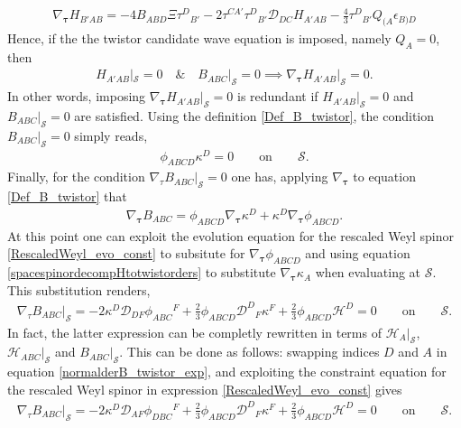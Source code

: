 \documentclass[10pt,a4paper]{article}
\theoremstyle{plain}
\begin{document}
\begin{align}
\nabla_{\bm\tau} H_{B'AB} = -4 B_{ABD} \Xi \tau ^{D}{}_{B'} -2 \tau ^{CA'}
\tau ^{D}{}_{B'} \mathcal{D} _{DC}H_{A'AB} - \tfrac{4}{3} \tau
^{D}{}_{B'}Q_{(A}\epsilon _{B)D}
\end{align}
Hence, if the the twistor candidate wave equation is imposed, namely
$Q_A=0$, then
\begin{align}
H_{A'AB}|_{\mathcal{S}}=0\quad \& \quad B_{ABC}|_{\mathcal{S}}=0
\implies \nabla_{\bm\tau} H_{A'AB}|_{\mathcal{S}}=0.
\end{align}
In other words, imposing $\nabla_{\bm\tau} H_{A'AB}|_{\mathcal{S}}=0$ is
redundant if $H_{A'AB}|_{\mathcal{S}}=0$ and $
B_{ABC}|_{\mathcal{S}}=0$ are satisfied.  Using the definition
\eqref{Def_B_twistor}, the condition $B_{ABC}|_{\mathcal{S}}=0$ simply
reads,
\begin{align}
  \phi_{ABCD}\kappa^D=0 \qquad \text{on} \qquad \mathcal{S}.
\end{align}
Finally, for the condition $\nabla_{\tau}B_{ABC}|_{\mathcal{S}}=0$ one
has, applying $\nabla_{\bm\tau}$ to equation \eqref{Def_B_twistor} that
\begin{align}
\nabla_{\bm\tau} B_{ABC} = \phi _{ABCD}\nabla_{\bm\tau} \kappa ^{D} + \kappa
^{D} \nabla_{\bm\tau} \phi _{ABCD} .
\end{align}
At this point one can exploit the evolution equation for the rescaled
Weyl spinor \eqref{RescaledWeyl_evo_const} to subsitute for
$\nabla_{\bm\tau} \phi_{ABCD}$ and using equation
\eqref {spacespinordecompHtotwistorders}
to substitute $\nabla_{\bm\tau} \kappa_A$ when evaluating at
$\mathcal{S}$. This substitution renders,
\begin{align}\label{normalderB_twistor_exp}
\nabla_{\tau}B_{ABC}|_{\mathcal{S}}= -2\kappa ^{D} \mathcal{D}
_{DF}\phi _{ABC}{}^{F} + \tfrac{2}{3} \phi _{ABCD} \mathcal{D}
^{D}{}_{F}\kappa ^{F} + \tfrac{2}{3}\phi_{ABCD}\mathcal{H}^D = 0 \qquad \text{on} \qquad \mathcal{S}.
\end{align}
In fact, the latter expression can be completly rewritten in terms of
$\mathcal{H}_A|_{\mathcal{S}}$, $\mathcal{H}_{ABC}|_{\mathcal{S}}$
and $B_{ABC}|_{\mathcal{S}}$. This can be done as follows: swapping indices $D$ and $A$ in equation
\eqref{normalderB_twistor_exp}, and exploiting the constraint equation for the rescaled Weyl spinor in expression
\eqref{RescaledWeyl_evo_const} gives
\begin{align}\label{normalderB_twistor_exp2}
\nabla_{\tau}B_{ABC}|_{\mathcal{S}}= -2 \kappa ^{D} \mathcal{D} _{AF}\phi _{DBC}{}^{F} + \tfrac{2}{3} \phi _{ABCD}
\mathcal{D} ^{D}{}_{F}\kappa ^{F} + \tfrac{2}{3}\phi_{ABCD}\mathcal{H}^D = 0 \qquad \text{on} \qquad
\mathcal{S}.
\end{align}
\end{document}

